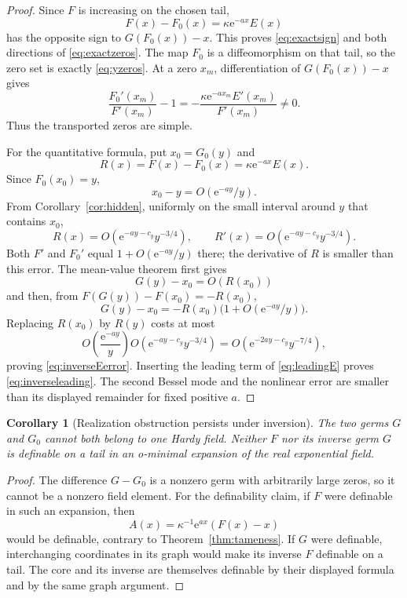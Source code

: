 \documentclass[11pt,a4paper]{article}
\newtheorem{corollary}[theorem]{Corollary}
\theoremstyle{definition}
\theoremstyle{remark}
\newcommand{\e}{\mathrm e}
\numberwithin{equation}{section}
\begin{document}
\begin{proof}
Since $F$ is increasing on the chosen tail,
\[
 F(x)-F_0(x)=\kappa\e^{-ax}E(x)
\]
has the opposite sign to $G(F_0(x))-x$. This proves \eqref{eq:exactsign} and both directions of \eqref{eq:exactzeros}. The map $F_0$ is a diffeomorphism on that tail, so the zero set is exactly \eqref{eq:yzeros}. At a zero $x_m$, differentiation of $G(F_0(x))-x$ gives
\[
 \frac{F_0'(x_m)}{F'(x_m)}-1
 =-\frac{\kappa\e^{-ax_m}E'(x_m)}{F'(x_m)}\ne0.
\]
Thus the transported zeros are simple.

For the quantitative formula, put $x_0=G_0(y)$ and
\[
 R(x)=F(x)-F_0(x)=\kappa\e^{-ax}E(x).
\]
Since $F_0(x_0)=y$,
\[
 x_0-y=O(\e^{-ay}/y).
\]
From Corollary~\ref{cor:hidden}, uniformly on the small interval around $y$ that contains $x_0$,
\[
 R(x)=O(\e^{-ay-c_y}y^{-3/4}),\qquad
 R'(x)=O(\e^{-ay-c_y}y^{-3/4}).
\]
Both $F'$ and $F_0'$ equal $1+O(\e^{-ay}/y)$ there; the derivative of $R$ is smaller than this error. The mean-value theorem first gives
\[
 G(y)-x_0=O(R(x_0))
\]
and then, from $F(G(y))-F(x_0)=-R(x_0)$,
\[
 G(y)-x_0=-R(x_0)\bigl(1+O(\e^{-ay}/y)\bigr).
\]
Replacing $R(x_0)$ by $R(y)$ costs at most
\[
 O\left(\frac{\e^{-ay}}y\right)
 O\left(\e^{-ay-c_y}y^{-3/4}\right)
 =O(\e^{-2ay-c_y}y^{-7/4}),
\]
proving \eqref{eq:inverseEerror}. Inserting the leading term of \eqref{eq:leadingE} proves \eqref{eq:inverseleading}. The second Bessel mode and the nonlinear error are smaller than its displayed remainder for fixed positive $a$.
\end{proof}

\begin{corollary}[Realization obstruction persists under inversion]\label{cor:inverseobstruction}
The two germs $G$ and $G_0$ cannot both belong to one Hardy field. Neither $F$ nor its inverse germ $G$ is definable on a tail in an o-minimal expansion of the real exponential field.
\end{corollary}
\begin{proof}
The difference $G-G_0$ is a nonzero germ with arbitrarily large zeros, so it cannot be a nonzero field element. For the definability claim, if $F$ were definable in such an expansion, then
\[
 A(x)=\kappa^{-1}\e^{ax}(F(x)-x)
\]
would be definable, contrary to Theorem~\ref{thm:tameness}. If $G$ were definable, interchanging coordinates in its graph would make its inverse $F$ definable on a tail. The core and its inverse are themselves definable by their displayed formula and by the same graph argument.
\end{proof}
\end{document}
